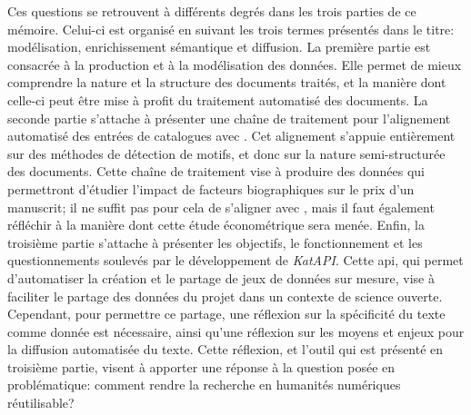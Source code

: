 Ces questions se retrouvent à différents degrés dans les trois parties de ce mémoire. Celui-ci est organisé en suivant les trois termes présentés dans le titre: modélisation, enrichissement sémantique et diffusion. La première partie est consacrée à la production et à la modélisation des données. Elle permet de mieux comprendre la nature et la structure des documents traités, et la manière dont celle-ci peut être mise à profit du traitement automatisé des documents. La seconde partie s'attache à présenter une chaîne de traitement pour l'alignement automatisé des entrées de catalogues avec \wkd{}. Cet alignement s'appuie entièrement sur des méthodes de détection de motifs, et donc sur la nature semi-structurée des documents. Cette chaîne de traitement vise à produire des données qui permettront d'étudier l'impact de facteurs biographiques sur le prix d'un manuscrit; il ne suffit pas pour cela de s'aligner avec \wkd{}, mais il faut également réfléchir à la manière dont cette étude économétrique sera menée. Enfin, la troisième partie s'attache à présenter les objectifs, le fonctionnement et les questionnements soulevés par le développement de \textit{KatAPI}. Cette \gls{api}, qui permet d'automatiser la création et le partage de jeux de données sur mesure, vise à faciliter le partage des données du projet dans un contexte de science ouverte. Cependant, pour permettre ce partage, une réflexion sur la spécificité du texte comme donnée est nécessaire, ainsi qu'une réflexion sur les moyens et enjeux pour la diffusion automatisée du texte. Cette réflexion, et l'outil qui est présenté en troisième partie, visent à apporter une réponse à la question posée en problématique: comment rendre la recherche en humanités numériques réutilisable?
